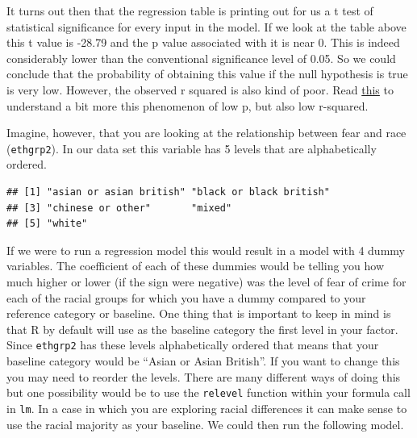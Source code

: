 \documentclass[]{book}
\newenvironment{Shaded}{\begin{snugshade}}{\end{snugshade}}
\newcommand{\KeywordTok}[1]{\textcolor[rgb]{0.13,0.29,0.53}{\textbf{#1}}}
\newcommand{\NormalTok}[1]{#1}
\newcommand{\OperatorTok}[1]{\textcolor[rgb]{0.81,0.36,0.00}{\textbf{#1}}}
\theoremstyle{definition}
\theoremstyle{definition}
\theoremstyle{definition}
\theoremstyle{remark}
\begin{document}
It turns out then that the regression table is printing out for us a t
test of statistical significance for every input in the model. If we
look at the table above this t value is -28.79 and the p value
associated with it is near 0. This is indeed considerably lower than the
conventional significance level of 0.05. So we could conclude that the
probability of obtaining this value if the null hypothesis is true is
very low. However, the observed r squared is also kind of poor. Read
\href{http://blog.minitab.com/blog/adventures-in-statistics/how-to-interpret-a-regression-model-with-low-r-squared-and-low-p-values}{this}
to understand a bit more this phenomenon of low p, but also low
r-squared.

Imagine, however, that you are looking at the relationship between fear
and race (\texttt{ethgrp2}). In our data set this variable has 5 levels
that are alphabetically ordered.

\begin{Shaded}
\end{Shaded}

\begin{verbatim}
## [1] "asian or asian british" "black or black british"
## [3] "chinese or other"       "mixed"                 
## [5] "white"
\end{verbatim}

If we were to run a regression model this would result in a model with 4
dummy variables. The coefficient of each of these dummies would be
telling you how much higher or lower (if the sign were negative) was the
level of fear of crime for each of the racial groups for which you have
a dummy compared to your reference category or baseline. One thing that
is important to keep in mind is that R by default will use as the
baseline category the first level in your factor. Since \texttt{ethgrp2}
has these levels alphabetically ordered that means that your baseline
category would be ``Asian or Asian British''. If you want to change this
you may need to reorder the levels. There are many different ways of
doing this but one possibility would be to use the \texttt{relevel}
function within your formula call in \texttt{lm}. In a case in which you
are exploring racial differences it can make sense to use the racial
majority as your baseline. We could then run the following model.
\end{document}

